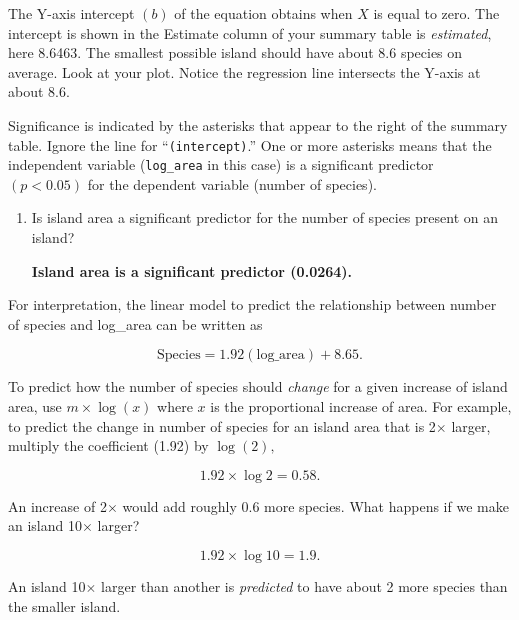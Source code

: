 \documentclass[11pt]{article}
\begin{document}
The Y-axis intercept $(b)$ of the equation obtains when $X$ is equal to zero. The intercept is shown in the Estimate column of your summary table is \emph{estimated}, here 8.6463. The smallest possible island should have about 8.6 species on average. Look at your plot. Notice the regression line intersects the Y-axis at about 8.6.

Significance is indicated by the asterisks that appear to the right of the summary table. Ignore the line for “\texttt{(intercept)}.” One or more asterisks means that the independent variable (\texttt{log\_area} in this case) is a significant predictor $(p < 0.05)$ for the dependent variable (number of species).

\begin{enumerate}[resume]
\item Is island area a significant predictor for the number of species present on an island?

\textbf{Island area is a significant predictor (0.0264).}

\vspace{2\baselineskip}

\end{enumerate}

For interpretation, the linear model to predict the relationship between number of species and log\_area can be written as

\[ \mathrm{Species} = 1.92\left(\mathrm{log\_area}\right) + 8.65.\]

To predict how the number of species should \emph{change} for a given  increase of island area, use $m \times \log(x)$ where $x$ is the proportional increase of area. For example, to predict the change in number of species for an island area that is 2$\times$ larger, multiply the coefficient (1.92) by $\log{(2)},$


 \[ 1.92 \times \log 2 = 0.58.\]
 
An increase of 2$\times$ would add roughly 0.6 more species. What happens if we make an island 10$\times$ larger? 
 
 \[ 1.92 \times \log10 = 1.9.\]
 
An island 10$\times$ larger than another is \emph{predicted} to have about 2 more species than the smaller island.
 
\end{document}
